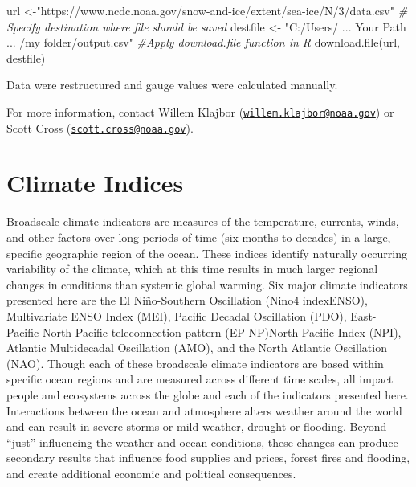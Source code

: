 \documentclass[
]{book}
\newenvironment{Shaded}{\begin{snugshade}}{\end{snugshade}}
\newcommand{\CommentTok}[1]{\textcolor[rgb]{0.56,0.35,0.01}{\textit{#1}}}
\newcommand{\FunctionTok}[1]{\textcolor[rgb]{0.00,0.00,0.00}{#1}}
\newcommand{\NormalTok}[1]{#1}
\newcommand{\OtherTok}[1]{\textcolor[rgb]{0.56,0.35,0.01}{#1}}
\newcommand{\StringTok}[1]{\textcolor[rgb]{0.31,0.60,0.02}{#1}}
\begin{document}
\begin{Shaded}
\begin{Highlighting}[]
\NormalTok{url }\OtherTok{\textless{}{-}}\StringTok{"https://www.ncdc.noaa.gov/snow{-}and{-}ice/extent/sea{-}ice/N/3/data.csv"}
\CommentTok{\# Specify destination where file should be saved}
\NormalTok{destfile }\OtherTok{\textless{}{-}} \StringTok{"C:/Users/ ... Your Path ... /my folder/output.csv"}
\CommentTok{\#Apply download.file function in R}
\FunctionTok{download.file}\NormalTok{(url, destfile)}
\end{Highlighting}
\end{Shaded}

Data were restructured and gauge values were calculated manually.

For more information, contact Willem Klajbor (\href{mailto:willem.klajbor@noaa.gov}{\nolinkurl{willem.klajbor@noaa.gov}}) or Scott Cross (\href{mailto:scott.cross@noaa.gov}{\nolinkurl{scott.cross@noaa.gov}}).

\hypertarget{climate-indices}{%
\chapter{Climate Indices}\label{climate-indices}}

Broadscale climate indicators are measures of the temperature, currents, winds, and other factors over long periods of time (six months to decades) in a large, specific geographic region of the ocean. These indices identify naturally occurring variability of the climate, which at this time results in much larger regional changes in conditions than systemic global warming. Six major climate indicators presented here are the El Niño-Southern Oscillation (Nino4 indexENSO), Multivariate ENSO Index (MEI), Pacific Decadal Oscillation (PDO), East-Pacific-North Pacific teleconnection pattern (EP-NP)North Pacific Index (NPI), Atlantic Multidecadal Oscillation (AMO), and the North Atlantic Oscillation (NAO). Though each of these broadscale climate indicators are based within specific ocean regions and are measured across different time scales, all impact people and ecosystems across the globe and each of the indicators presented here. Interactions between the ocean and atmosphere alters weather around the world and can result in severe storms or mild weather, drought or flooding. Beyond ``just'' influencing the weather and ocean conditions, these changes can produce secondary results that influence food supplies and prices, forest fires and flooding, and create additional economic and political consequences.
\end{document}
